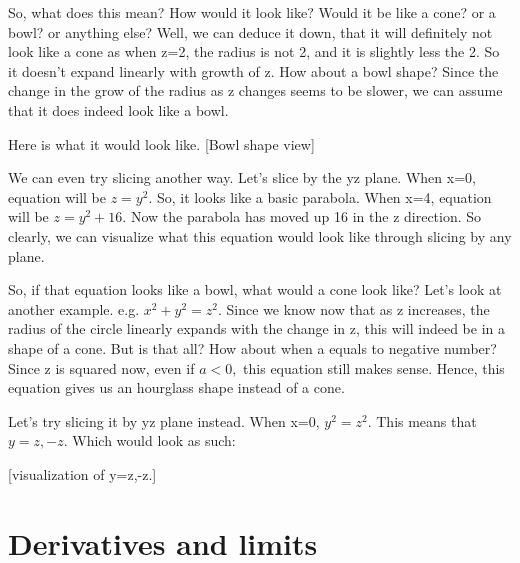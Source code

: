 \documentclass[addpoints]{exam}
\begin{document}
{So, what does this mean? How would it look like? Would it be like a cone? or a bowl? or anything else? Well, we can deduce it down, that it will definitely not look like a cone as when z=2, the radius is not 2, and it is slightly less the 2. So it doesn't expand linearly with growth of z. How about a bowl shape? Since the change in the grow of the radius as z changes seems to be slower, we can assume that it does indeed look like a bowl.

Here is what it would look like. [Bowl shape view]

We can even try slicing another way. Let's slice by the yz plane. When x=0, equation will be $z=y^2.$ So, it looks like a basic parabola. When x=4, equation will be $z=y^2+16.$ Now the parabola has moved up 16 in the z direction. So clearly, we can visualize what this equation would look like through slicing by any plane.

So, if that equation looks like a bowl, what would a cone look like? Let's look at another example. e.g. $x^2+y^2=z^2.$ Since we know now that as z increases, the radius of the circle linearly expands with the change in z, this will indeed be in a shape of a cone. But is that all? How about when a equals to negative number? Since z is squared now, even if $a<0,$ this equation still makes sense. Hence, this equation gives us an hourglass shape instead of a cone. 

Let's try slicing it by yz plane instead. When x=0, $y^2=z^2.$ This means that $y=z,-z.$ Which would look as such:

[visualization of y=z,-z.]
}
\section{Derivatives and limits}
\end{document}
